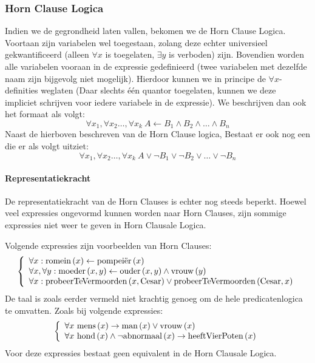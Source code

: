 \subsubsection{Horn Clause Logica}
\label{sss:hornClausaleLogic}
Indien we de gegrondheid laten vallen, bekomen we de Horn Clause Logica. Voortaan zijn variabelen wel toegestaan, zolang deze echter universieel gekwantificeerd (alleen $\forall x$ is toegelaten, $\exists y$ is verboden) zijn. Bovendien worden alle variabelen vooraan in de expressie gedefinieerd (twee variabelen met dezelfde naam zijn bijgevolg niet mogelijk). Hierdoor kunnen we in principe de $\forall x$-definities weglaten (Daar slechts \'e\'en quantor toegelaten, kunnen we deze impliciet schrijven voor iedere variabele in de expressie). We beschrijven dan ook het formaat als volgt:
\begin{equation}
\forall x_1,\forall x_2\ldots,\forall x_k\ A\leftarrow B_1\wedge B_2\wedge\ldots\wedge B_n
\end{equation}
Naast de hierboven beschreven  van de Horn Clause logica, Bestaat er ook nog een  die er als volgt uitziet:
\begin{equation}
\forall x_1,\forall x_2\ldots,\forall x_k\ A\vee\neg B_1\vee\neg B_2\vee\ldots\vee\neg B_n
\end{equation}
\paragraph{Representatiekracht}
De representatiekracht van de Horn Clauses is echter nog steeds beperkt. Hoewel veel expressies ongevormd kunnen worden naar Horn Clauses, zijn sommige expressies niet weer te geven in Horn Clausale Logica.
\begin{leftbar}
Volgende expressies zijn voorbeelden van Horn Clauses:
\begin{equation}
\left\{\begin{array}{l}
\forall x:\mbox{romein}\left( x \right)\leftarrow\mbox{pompei\"er}\left( x \right)\\
\forall x,\forall y:\mbox{moeder}\left( x,y \right)\leftarrow\mbox{ouder}\left( x,y \right)\wedge\mbox{vrouw}\left( y \right)\\
\forall x:\mbox{probeerTeVermoorden}\left( x,\mbox{Cesar} \right)\vee\mbox{probeerTeVermoorden}\left( \mbox{Cesar},x \right)
\end{array}\right.
\end{equation}
De taal is zoals eerder vermeld niet krachtig genoeg om de hele predicatenlogica te omvatten. Zoals bij volgende expressies:
\begin{equation}
\left\{\begin{array}{l}
\forall x\ \mathfunc{mens}{x}\rightarrow\mathfunc{man}{x}\vee\mathfunc{vrouw}{x}\\
\forall x\ \mathfunc{hond}{x}\wedge\neg\mathfunc{abnormaal}{x}\rightarrow\mathfunc{heeftVierPoten}{x}
\end{array}\right.
\end{equation}
Voor deze expressies bestaat geen equivalent in de Horn Clausale Logica.
\end{leftbar}
